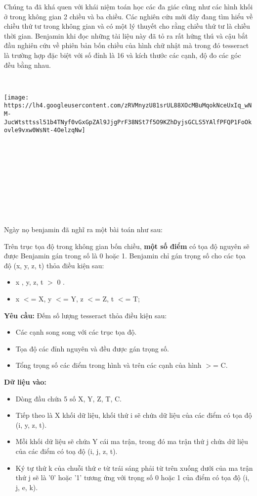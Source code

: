 

Chúng ta đã khá quen với khái niệm toán học các đa giác cũng như các hình khối ở trong không gian 2 chiều và ba chiều. Các nghiên cứu mới đây đang tìm hiểu về chiều thứ tư trong không gian và có một lý thuyết cho rằng chiều thứ tư là chiều thời gian. Benjamin khi đọc những tài liệu này đã tỏ ra rất hứng thú và cậu bắt đầu nghiên cứu về phiên bản bốn chiều của hình chữ nhật mà trong đó tesseract là trường hợp đặc biệt với số đỉnh là 16 và kích thước các cạnh, độ đo các góc đều bằng nhau.

 


\texttt{[image: https://lh4.googleusercontent.com/zRVMnyzU81srUL88XOcMBuMqokNceUxIq\_wNM-JucWtsttssl51b4TNyf0vGxGpZAl9JjgPrF38NSt7f5O9KZhDyjsGCLS5YAlfPFQP1FoOkovle9vxw0WsNt-4OelzqNw]}

 

 

 

 

 

Ngày nọ benjamin đã nghĩ ra một bài toán như sau:

Trên trục tọa độ trong không gian bốn chiều, \textbf{ một số điểm } có tọa độ nguyên sẽ được Benjamin gán trong số là 0 hoặc 1. Benjamin chỉ gán trọng số cho các tọa độ (x, y, z, t) thỏa điều kiện sau:
\begin{itemize}
	\item 

x , y, z, t $>$ 0 .
	\item 

x $<$= X, y $<$= Y, z $<$= Z, t $<$= T;
\end{itemize}

\textbf{Yêu cầu: } Đếm số lượng tesseract thỏa điều kiện sau:
\begin{itemize}
	\item 

Các cạnh song song với các trục tọa độ.
	\item 

Tọa độ các đỉnh nguyên và đều được gán trọng số.
	\item 

Tổng trọng số các điểm trong hình và trên các cạnh của hình $>$= C.
\end{itemize}

\textbf{Dữ liệu vào: }
\begin{itemize}
	\item 

Dòng đầu chứa 5 số X, Y, Z, T, C.
	\item 

Tiếp theo là X khối dữ liệu, khối thứ i sẽ chứa dữ liệu của các điểm có tọa độ (i, y, z, t).
	\item 

Mỗi khối dữ liệu sẽ chứa Y cái ma trận, trong đó ma trận thứ j chứa dữ liệu của các điểm có toạ độ (i, j, z, t).
	\item 

Ký tự thứ k của chuỗi thứ e từ trái sáng phải từ trên xuống dưới của ma trận thứ j sẽ là '0' hoặc '1' tương ứng với trọng số 0 hoặc 1 của điểm có tọa độ (i, j, e, k).
\end{itemize}

